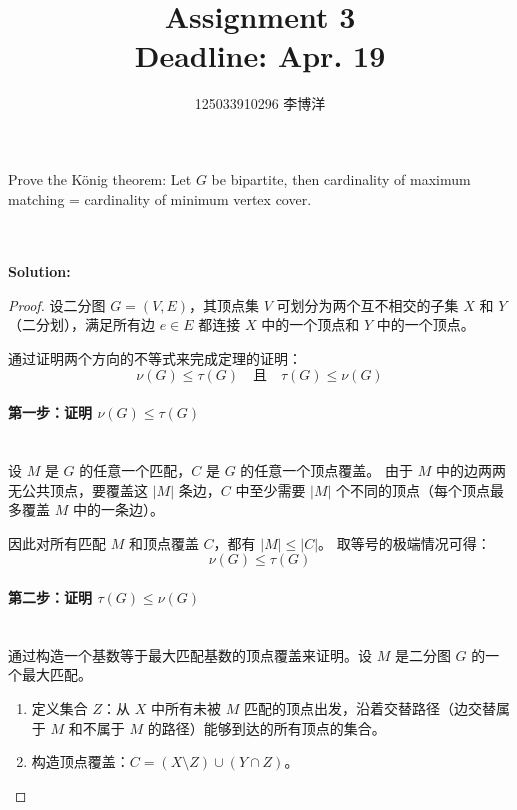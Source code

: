 \documentclass{article}
\title{{\bf Assignment 3} \\ {\large Deadline: Apr. 19}}
\author{125033910296 李博洋}
\date{}
\newcounter{exercise}
\newcommand{\<}{
    \langle}
\renewcommand{\>}{
    \rangle}
\begin{document}
\maketitle


{\large

\begin{exercise}
Prove the K\"onig theorem: Let $G$ be bipartite, then cardinality of maximum matching = cardinality of minimum vertex cover.
\end{exercise}
\\\\
\noindent\textbf{Solution:}
\newcommand{\card}[1]{\left|#1\right|} %
\newcommand{\nuG}{\nu(G)} %
\newcommand{\tauG}{\tau(G)} %
\begin{proof}
设二分图 $G=(V,E)$，其顶点集 $V$ 可划分为两个互不相交的子集 $X$ 和 $Y$（二分划），满足所有边 $e\in E$ 都连接 $X$ 中的一个顶点和 $Y$ 中的一个顶点。

通过证明两个方向的不等式来完成定理的证明：
\[
\nuG \leq \tauG \quad \text{且} \quad \tauG \leq \nuG
\]

\paragraph{第一步：证明 $\nuG \leq \tauG$}
\\

设 $M$ 是 $G$ 的任意一个匹配，$C$ 是 $G$ 的任意一个顶点覆盖。
由于 $M$ 中的边两两无公共顶点，要覆盖这 $\card{M}$ 条边，$C$ 中至少需要 $\card{M}$ 个不同的顶点（每个顶点最多覆盖 $M$ 中的一条边）。

因此对所有匹配 $M$ 和顶点覆盖 $C$，都有 $\card{M} \leq \card{C}$。
取等号的极端情况可得：
\[
\nuG \leq \tauG
\]

\paragraph{第二步：证明 $\tauG \leq \nuG$}
\\

通过构造一个基数等于最大匹配基数的顶点覆盖来证明。设 $M$ 是二分图 $G$ 的一个最大匹配。
\begin{enumerate}
    \item 定义集合 $Z$：从 $X$ 中所有未被 $M$ 匹配的顶点出发，沿着交替路径（边交替属于 $M$ 和不属于 $M$ 的路径）能够到达的所有顶点的集合。
    \item 构造顶点覆盖：$C = (X \setminus Z) \cup (Y \cap Z)$。
\end{enumerate}


\end{proof}}
\end{document}
